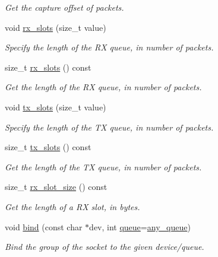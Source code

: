 \begin{DoxyCompactItemize}
\begin{DoxyCompactList}\small\item\em Get the capture offset of packets. \end{DoxyCompactList}\item 
void \hyperlink{classnet_1_1pfq_a878c768492c68fc572a994a58913a3db}{rx\-\_\-slots} (size\-\_\-t value)
\begin{DoxyCompactList}\small\item\em Specify the length of the R\-X queue, in number of packets. \end{DoxyCompactList}\item 
size\-\_\-t \hyperlink{classnet_1_1pfq_aa4382e74b5975f81e5b5f676ed0177bb}{rx\-\_\-slots} () const 
\begin{DoxyCompactList}\small\item\em Get the length of the R\-X queue, in number of packets. \end{DoxyCompactList}\item 
void \hyperlink{classnet_1_1pfq_aae98015b961c6210081fa29a2ea34da2}{tx\-\_\-slots} (size\-\_\-t value)
\begin{DoxyCompactList}\small\item\em Specify the length of the T\-X queue, in number of packets. \end{DoxyCompactList}\item 
size\-\_\-t \hyperlink{classnet_1_1pfq_aea6852bcf02bf2430a6a7fe25131c4ab}{tx\-\_\-slots} () const 
\begin{DoxyCompactList}\small\item\em Get the length of the T\-X queue, in number of packets. \end{DoxyCompactList}\item 
size\-\_\-t \hyperlink{classnet_1_1pfq_a8616d3cd53f1a49ff347cc4599e7c04c}{rx\-\_\-slot\-\_\-size} () const 
\begin{DoxyCompactList}\small\item\em Get the length of a R\-X slot, in bytes. \end{DoxyCompactList}\item 
void \hyperlink{classnet_1_1pfq_a3e55b38d9f094ab88c3510c91a3c8ac5}{bind} (const char $\ast$dev, int \hyperlink{classnet_1_1queue}{queue}=\hyperlink{classnet_1_1pfq_a0d4eca6d0925b7c49365675c9cf9385c}{any\-\_\-queue})
\begin{DoxyCompactList}\small\item\em Bind the group of the socket to the given device/queue. \end{DoxyCompactList}\item 

\end{DoxyCompactItemize}
